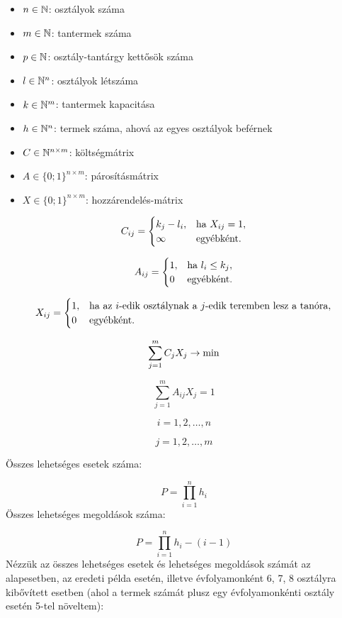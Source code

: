 
\begin{itemize}
	\item $n \in \Bbb{N}$: osztályok száma
	\item $m \in \Bbb{N}$: tantermek száma
	\item $p \in \Bbb{N}$: osztály-tantárgy kettősök száma
	\item $l \in \Bbb{N}^n$: osztályok létszáma
	\item $k \in \Bbb{N}^m$: tantermek kapacitása
	\item $h \in \Bbb{N}^n$: termek száma, ahová az egyes osztályok beférnek
	\item $C \in \Bbb{N}^{n \times m}$: költségmátrix
	\item $A \in \{0;1\}^{n \times m}$: párosításmátrix
	\item $X \in \{0;1\}^{n \times m}$: hozzárendelés-mátrix
\end{itemize}

\[
C_{ij} =
\begin{cases}
k_j-l_i, & \hbox{ha } X_{ij}=1, \\
\infty & \hbox{egyébként}.
\end{cases}
\]

\[
A_{ij} =
\begin{cases}
1, & \hbox{ha } l_i \leq k_j, \\
0& \hbox{egyébként}.
\end{cases}
\]

\[
X_{ij} =
\begin{cases}
1, & \hbox{ha az $i$-edik osztálynak a $j$-edik teremben lesz a tanóra}, \\
0&
\hbox{egyébként}.
\end{cases}
\]

$$\sum_{j=1}^m C_jX_j \rightarrow \hbox{min}$$

$$\sum_{j=1}^m A_{ij}X_j=1$$

$$i=1, 2, \ldots, n$$

$$j=1, 2, \ldots, m$$


Összes lehetséges esetek száma:

$$P=\prod_{i=1}^n h_i$$
Összes lehetséges megoldások száma:

$$P=\prod_{i=1}^n h_i-(i-1)$$
Nézzük az összes lehetséges esetek és lehetséges megoldások számát az alapesetben, az eredeti példa esetén,
illetve évfolyamonként 6, 7, 8 osztályra kibővített esetben (ahol a termek számát plusz egy évfolyamonkénti osztály
esetén 5-tel növeltem): 

